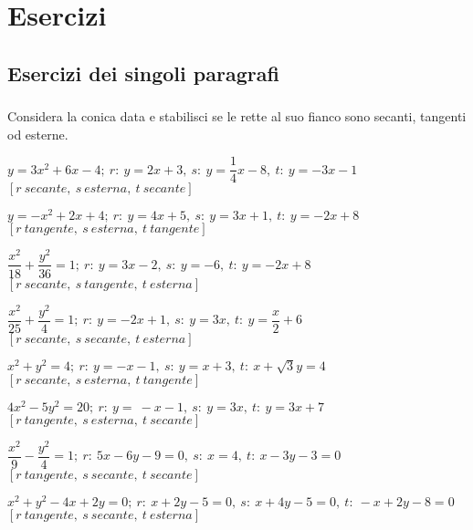 
\section{Esercizi}

\subsection{Esercizi dei singoli paragrafi}

\subsubsection*{}

\begin{esercizio}
  \label{ese:div.003}
  Considera la conica data e stabilisci se le rette al suo fianco 
sono secanti, tangenti od esterne.
  \begin{enumeratea}

\item \(y=3 x^{2} +6x-4;~r:~y=2x+3,~s:~y=\dfrac{1}{4}x-8,~t:~y=-3x-1\)\\ 
\hfill  \(\left[r~secante,~s ~esterna,~ t~secante\right]\)
\item \(y=-x^{2}+2x+4;~r:~y=4x+5,~s:~y=3x+1,~t:~y=-2x+8\)\\
\hfill \(\left[r~tangente,~s~esterna,~t~tangente\right]\)
\item \(\dfrac{x^{2}}{18} 
+\dfrac{y^{2}}{36}=1;~r:~y=3x-2,~s:~y=-6,~t:~y=-2x+8\)\\
\hfill \(\left[r~secante,~s~tangente,~t~esterna\right]\)
\item \(\dfrac{x^{2}}{25}+\dfrac{y^{2}}{4}=1;~r:~y=-2x+1,~s:~y=3x,~t:~y= 
\dfrac{x}{2} +6\)\\
\hfill \(\left[r~secante,~s~secante,~t~esterna\right]\)
\item \( x^{2}+y^{2}=4;~r:~y=-x-1,~s:~y=x+3,~t:~x+\sqrt{3}y=4\)\\
\hfill \(\left[r~secante,~s~esterna,~t~tangente\right]\)
\item \(4 x^{2}-5 y^{2}=20;~r:~y=~-x-1,~s:~y=3x,~t:~y=3x+7\)\\
\hfill \(\left[r~tangente,~s~esterna,~t~secante\right]\)
\item \(\dfrac{x^{2}}{9}-\dfrac{y^{2}}{4}=1;~r:~5x-6y-9=0,~s:~x=4,~t:~ 
x-3y-3=0\)\\
\hfill \(\left[r~tangente,~s~secante,~t~secante\right]\)
\item \(x^{2}+y^{2}-4x+2y=0;~r:~x+2y-5=0,~s:~x+4y-5=0,~t:~-x+2y-8=0\)\\
\hfill \(\left[r~tangente,~s~secante,~t~esterna\right]\)
\end{enumeratea}
\end{esercizio}

